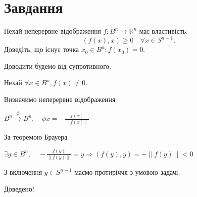 
\chapter{Завдання \theHchapter}

\begin{tcolorbox}[title=Завдання]
    Нехай неперервне відображення $f: B^{n} \rightarrow \mathbb{R}^{n}$ має властивість:
    $$(f(x), x) \geq 0 \quad \forall x \in S^{n-1} .$$
    Доведіть, що існує точка $x_{0} \in B^{n}: f\left(x_{0}\right)=0$.

\end{tcolorbox}


Доводити будемо від супротивного. 


Нехай 
$\forall x \in B^n, f(x) \neq 0 $.


Визначимо неперервне відображення 


$B^n \xrightarrow{\phi} B^n, \quad 
\phi x = - \frac{f(x)}{\|f(x)\|}$


За теоремою Брауера 


$\exists y \in B^n, \quad-\frac{f(y)}{\|f(y)\|} = y \Rightarrow 
(f(y), y) = -\|f(y)\| < 0$


З включення $y \in S^{n-1}$ маємо протиріччя з умовою задачі.


Доведено!